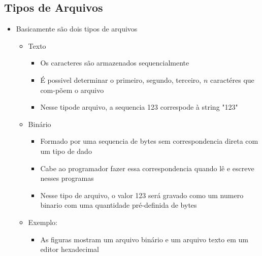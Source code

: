 \documentclass[12pt]{article}
\begin{document}
    \subsection{Tipos de Arquivos}
    \begin{itemize}
        \item Basicamente são dois tipos de arquivos
        \begin{itemize}
            \item Texto
            \begin{itemize}
                \item Os caracteres são armazenados sequencialmente
                \item É possivel determinar o primeiro, segundo, terceiro, 
                $n$ caractéres que com-põem o arquivo
                \item Nesse tipode arquivo, a sequencia 123 correspode à string 
                "123"
            \end{itemize}
            \item Binário
            \begin{itemize}
                \item Formado por uma sequencia de bytes sem correspondencia 
                direta com um tipo de dado
                \item Cabe ao programador fazer essa correspondencia quando lê 
                e escreve nesses programas
                \item Nesse tipo de arquivo, o valor 123 será gravado como um 
                numero binario com uma quantidade pré-definida de bytes
            \end{itemize}
            \item Exemplo:
            \begin{itemize}
                \item As figuras mostram um arquivo binário e um arquivo texto 
                em um editor hexadecimal
            \end{itemize}
        \end{itemize}
    \end{itemize}
\end{document}
